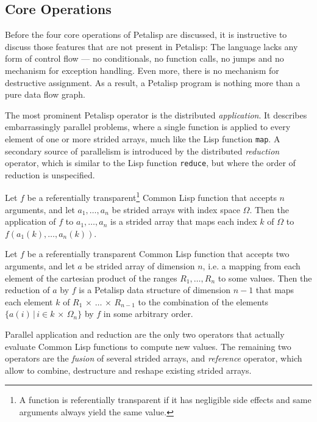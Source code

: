\subsection{Core Operations}

Before the four core operations of Petalisp are discussed, it is
instructive to discuss those features that are not present in Petalisp: The
language lacks any form of control flow --- no conditionals, no function
calls, no jumps and no mechanism for exception handling. Even more, there
is no mechanism for destructive assignment. As a result, a Petalisp program
is nothing more than a pure data flow graph.

The most prominent Petalisp operator is the distributed
\emph{application}. It describes embarrassingly parallel problems, where a
single function is applied to every element of one or more strided arrays,
much like the Lisp function \texttt{map}. A secondary source of parallelism
is introduced by the distributed \emph{reduction} operator, which is
similar to the Lisp function \texttt{reduce}, but where the order of
reduction is unspecified.

\begin{define}[application]
  Let $f$ be a referentially transparent\footnote{A function is
    referentially transparent if it has negligible side effects and same
    arguments always yield the same value.} Common Lisp function that
  accepts $n$ arguments, and let $a_{1}, \ldots, a_{n}$ be strided arrays
  with index space $\Omega$. Then the application of $f$ to
  $a_{1}, \ldots, a_{n}$ is a strided array that maps each index $k$ of
  $\Omega$ to $f( a_{1}(k), \ldots, a_{n}(k) )$.
\end{define}

\begin{define}[reduction]
  \label{def:reduction}
  Let $f$ be a referentially transparent Common Lisp function that accepts
  two arguments, and let $a$ be strided array of dimension $n$, i.e. a
  mapping from each element of the cartesian product of the ranges
  $R_{1}, \ldots, R_{n}$ to some values. Then the reduction of $a$ by $f$
  is a Petalisp data structure of dimension $n-1$ that maps each element
  $k$ of $R_{1} \,\times\, \ldots \, \times \, R_{n-1}$ to the combination of the
  elements $\{ a(i) \,|\, i \in k \,\times\, \Omega_{n} \}$ by $f$ in some
  arbitrary order.
\end{define}

Parallel application and reduction are the only two operators that actually
evaluate Common Lisp functions to compute new values. The remaining two
operators are the \emph{fusion} of several strided arrays, and
\emph{reference} operator, which allow to combine, destructure and reshape
existing strided arrays.


